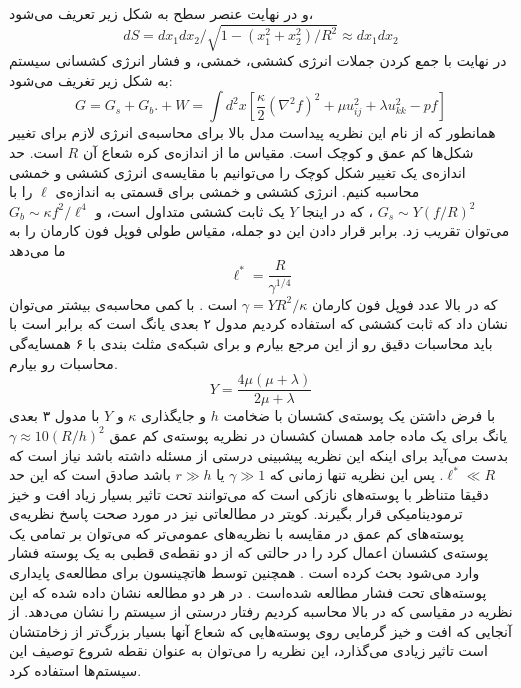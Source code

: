 و در نهایت  عنصر سطح به شکل زیر تعریف می‌شود،
\begin{equation}
dS=dx_1dx_2/\sqrt{1-(x_1^2+x_2^2)/R^2}\approx dx_1dx_2
\label{eq:nelsonS8.1}
\end{equation}
در نهایت با جمع کردن جملات انرژی کششی، خمشی، و فشار انرژی کشسانی سیستم به شکل زیر تغریف می‌شود:
\begin{equation}
G = G_s + G_b. + W =\int d^2x\left[\frac{\kappa}{2}(\nabla^2f)^2+\mu u_{ij}^2+\lambda u_{kk}^2-pf\right]
\label{eq:nelsonS8.2}
\end{equation}
همانطور که از نام این نظریه پیداست مدل بالا برای محاسبه‌ی انرژی لازم برای تغییر شکل‌ها کم عمق و کوچک است. مقیاس ما از اندازه‌ی کره شعاع آن
$R$
است. حد اندازه‌ی یک تغییر شکل کوچک را می‌توانیم با مقایسه‌ی انرژی کششی و خمشی محاسبه کنیم. انرژی کششی و خمشی برای قسمتی به اندازه‌ی
$\ell$
را با 
$G_s\sim Y(f/R)^2$
، که در اینجا $Y$ یک ثابت کششی‌ متداول است، و 
$G_b\sim\kappa f^2/\ell^4$
می‌توان تقریب زد. برابر قرار دادن این دو جمله، مقیاس طولی فوپل فون کارمان
را به ما می‌دهد
\begin{equation}
\ell^*=\frac{R}{\gamma^{1/4}}
\label{eq:nelsonS9}
\end{equation}
که در بالا عدد فوپل فون کارمان 
$\gamma=YR^2/\kappa$
است
\cite{nelsonPRE2003}
. با کمی محاسبه‌ی بیشتر می‌توان نشان داد که ثابت کششی که استفاده کردیم مدول ۲ بعدی یانگ است که برابر است با
\cite{nelsonPRA1988}
باید محاسبات دقیق رو از این مرجع بیارم و برای شبکه‌ی مثلث بندی با ۶ همسایه‌گی محاسبات رو بیارم.
\begin{equation}
Y= \frac{4\mu(\mu+\lambda)}{2\mu+\lambda}
\label{eq:nelsonS9.1}
\end{equation}
با فرض داشتن یک پوسته‌ی کشسان با ضخامت $h$ و جایگذاری $\kappa$ و $Y$ با مدول ۳ بعدی یانگ برای یک ماده جامد همسان کشسان در نظریه پوسته‌ی کم عمق $\gamma\approx10(R/h)^2$ بدست می‌آید 
\cite{landau}
برای اینکه این نظریه پیشبینی درستی از مسئله داشته باشد نیاز است که $\ell^*\ll R$. پس این نظریه تنها زمانی که $\gamma\gg1$ یا $r\gg h$ باشد صادق است که این حد دقیقا متناظر با پوسته‌های نازکی است که می‌توانند تحت تاثیر بسیار زیاد افت و خیز ترمودینامیکی قرار بگیرند. کویتر
در مطالعاتی نیز در مورد صحت پاسخ نظریه‌ی پوسته‌های کم عمق در مقایسه با نظریه‌های عمومی‌تر که می‌توان بر تمامی یک پوسته‌ی کشسان اعمال کرد را در حالتی که از دو نقطه‌ی قطبی به یک پوسته فشار وارد می‌شود بحث کرده است
\cite{koiter1963}
 . همچنین توسط هاتچینسون
برای مطالعه‌ی پایداری پوسته‌های تحت فشار مطالعه شده‌است
\cite{Hutchinson1967}
. در هر دو مطالعه نشان داده شده که این نظریه در مقیاسی که در بالا محاسبه کردیم رفتار درستی از سیستم را نشان می‌دهد. از آنجایی که افت و خیز گرمایی روی پوسته‌هایی که شعاع آنها بسیار بزرگ‌تر از زخامتشان است تاثیر زیادی‌ می‌گذارد، این نظریه را می‌توان به عنوان نقطه‌ شروع توصیف این سیستم‌ها استفاده کرد.
